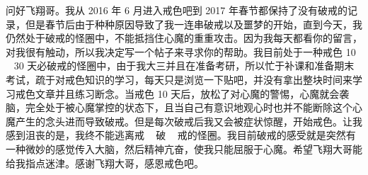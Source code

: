 \begin{case}
    问好飞翔哥。我从 2016 年 6 月进入戒色吧到 2017 年春节都保持了没有破戒的记录，但是春节后由于种种原因导致了我一连串破戒以及噩梦的开始，直到今天，我仍然处于破戒的怪圈中，不能抵挡住心魔的重重攻击。因为我每天都看你的留言，对我很有触动，所以我决定写一个帖子来寻求你的帮助。我目前处于一种戒色 10 ~ 30 天必破戒的怪圈中，由于我大三并且在准备考研，所以忙于补课和准备期末考试，疏于对戒色知识的学习，每天只是浏览一下贴吧，并没有拿出整块时间来学习戒色文章并且练习断念。当戒色 10 天后，放松了对心魔的警惕，心魔就会袭脑，完全处于被心魔掌控的状态下，且当自己有意识地观心时也并不能断除这个心魔产生的念头进而导致破戒。但是每次破戒后我又会被症状惊醒，开始戒色。让我感到沮丧的是，我终不能逃离戒 ~ 破 ~ 戒的怪圈。我目前破戒的感受就是突然有一种微妙的感觉传入大脑，然后精神亢奋，使我只能屈服于心魔。希望飞翔大哥能给我指点迷津。感谢飞翔大哥，感恩戒色吧。


\end{case}
